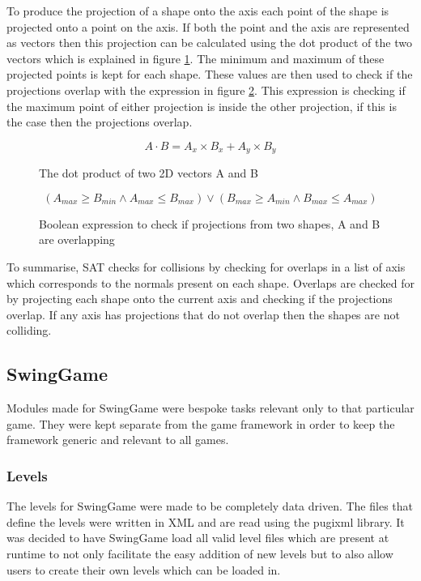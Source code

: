 \documentclass[]{report}
\begin{document}
			To produce the projection of a shape onto the axis each point of the shape is projected onto a point on the axis. If both the point and the axis are represented as vectors then this projection can be calculated using the dot product of the two vectors\cite{sattutorial} which is explained in figure \ref{dotproduct}. The minimum and maximum of these projected points is kept for each shape. These values are then used to check if the projections overlap with the expression in figure \ref{projectionoverlapexpression}. This expression is checking if the maximum point of either projection is inside the other projection, if this is the case then the projections overlap.
			
			\begin{figure}[H]
				\centering
				\begin{displaymath}
					A \cdot B = A_x \times B_x + A_y \times B_y
				\end{displaymath}
				\caption{The dot product of two 2D vectors A and B}
				\label{dotproduct}
			\end{figure}
			
			\begin{figure}[H]
				\centering
				\begin{displaymath}
					(A_{max} \geq B_{min} \land A_{max} \leq B_{max}) \lor (B_{max} \geq A_{min} \land B_{max} \leq A_{max})
				\end{displaymath}
				\caption{Boolean expression to check if projections from two shapes, A and B are overlapping}
				\label{projectionoverlapexpression}
			\end{figure}
			
			To summarise, SAT checks for collisions by checking for overlaps in a list of axis which corresponds to the normals present on each shape. Overlaps are checked for by projecting each shape onto the current axis and checking if the projections overlap. If any axis has projections that do not overlap then the shapes are not colliding.
			
		\subsection{SwingGame}
		Modules made for SwingGame were bespoke tasks relevant only to that particular game. They were kept separate from the game framework in order to keep the framework generic and relevant to all games.
			\subsubsection{Levels}
			The levels for SwingGame were made to be completely data driven. The files that define the levels were written in XML and are read using the pugixml library. It was decided to have SwingGame load all valid level files which are present at runtime to not only facilitate the easy addition of new levels but to also allow users to create their own levels which can be loaded in.
			
\end{document}
